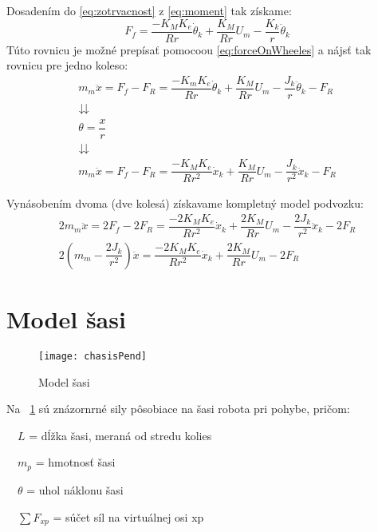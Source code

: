 Dosadením do \eqref{eq:zotrvacnost} z \eqref{eq:moment} tak získame:
\begin{equation}
F_f = \dfrac{-K_M K_e}{Rr}\dot{\theta}_k + \dfrac{K_M}{Rr}U_m - \dfrac{K_k}{r}\ddot{\theta}_k
\end{equation}
Túto rovnicu je možné prepísať pomocoou \eqref{eq:forceOnWheeles} a nájsť tak rovnicu pre jedno koleso:
\begin{equation}
\begin{gathered}
m_m \ddot{x} = F_f - F_R =  \dfrac{-K_m K_e}{Rr}\dot{\theta}_k + \dfrac{K_M}{Rr}U_m - \dfrac{J_k}{r}\ddot{\theta}_k - F_R \\
\downdownarrows
\\
\theta = \dfrac{x}{r}
\\
\downdownarrows
\\
m_m \ddot{x} = F_f - F_R = \dfrac{-K_M K_e}{R r^2}\dot{x}_k + \dfrac{K_M}{Rr}U_m - \dfrac{J_k}{r^2}\ddot{x}_k - F_R
\end{gathered}
\end{equation}

Vynásobením dvoma (dve kolesá) získavame kompletný model podvozku:
\begin{equation}
\begin{gathered}
2m_m \ddot{x} = 2F_f - 2F_R = \dfrac{-2K_M K_e}{R r^2}\dot{x}_k + \dfrac{2K_M}{Rr}U_m - \dfrac{2J_k}{r^2}\ddot{x}_k - 2F_R
\\
2(m_m - \dfrac{2J_k}{r^2}) \ddot{x} = \dfrac{-2K_M K_e}{R r^2}\dot{x}_k + \dfrac{2K_M}{Rr}U_m - 2F_R
\end{gathered}
\label{eq:wheels}
\end{equation}

\section{Model šasi}


\begin{figure}[b]
\centering
\texttt{[image: chasisPend]}
\caption{Model šasi}
\label{fig:chasisPend}
\end{figure}

Na \figurename~\ref{fig:chasisPend} sú znázornrné sily pôsobiace na šasi robota pri pohybe, pričom:

$\quad L$ = dĺžka šasi, meraná od stredu kolies

$\quad m_p$ = hmotnosť šasi

$\quad \theta$ = uhol náklonu šasi

$\quad \sum{F_{xp}}$ = súčet síl na virtuálnej osi xp

